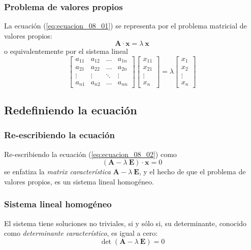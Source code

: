 \begin{frame}
\frametitle{Problema de valores propios}
La ecuación (\ref{eq:ecuacion_08_01}) se representa por el problema matricial de valores propios:
\begin{equation}
\mathbf{A \cdot x} = \lambda \: \mathbf{x}
\label{eq:ecuacion_08_02}
\end{equation}
\pause
o equivalentemente por el sistema lineal
\begin{equation}
\begin{bmatrix}
a_{11} & a_{12} & \ldots & a_{1n} \\
a_{21} & a_{22} & \ldots & a_{2n} \\
\vdots & \vdots & \ddots & \vdots \\
a_{n1} & a_{n2} & \ldots & a_{nn} 
\end{bmatrix}
\begin{bmatrix}
x_{11} \\
x_{21} \\
\vdots \\
x_{n}
\end{bmatrix}
= \lambda
\begin{bmatrix}
x_{1} \\
x_{2} \\
\vdots \\
x_{n}
\end{bmatrix}
\label{eq:ecuacion_08_03}
\end{equation}
\end{frame}
\subsection*{Redefiniendo la ecuación}
\begin{frame}
\frametitle{Re-escribiendo la ecuación}
Re-escribiendo la ecuación (\ref{eq:ecuacion_08_02}) como
\begin{equation}
(\mathbf{A} - \lambda \: \mathbf{E}) \cdot \mathbf{x} = 0
\label{eq:ecuacion_08_04}
\end{equation}
se enfatiza la \emph{matrix característica} $\mathbf{A} - \lambda \: \mathbf{E}$, y el hecho de que el problema de valores propios, es un sistema lineal homogéneo.
\end{frame}
\begin{frame}
\frametitle{Sistema lineal homogéneo}
El sistema tiene soluciones no triviales, si y sólo si, su determinante, conocido como \emph{determinante característico}, es igual a cero:
\begin{equation}
\det (\mathbf{A} - \lambda \: \mathbf{E}) = 0
\label{eq:ecuacion_08_05}
\end{equation}
\end{frame}
